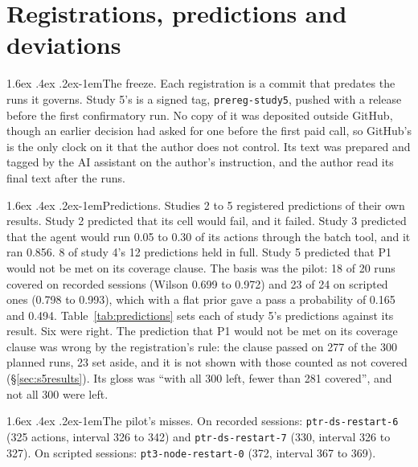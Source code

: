\documentclass[11pt]{article}
\makeatletter
\renewcommand\paragraph{\@startsection{paragraph}{4}{\z@}%
  {1.6ex \@plus .4ex \@minus .2ex}{-1em}{\normalfont\normalsize\bfseries}}
\makeatother
\begin{document}
\appendix

\section{Registrations, predictions and deviations}
\label{app:registration}

\paragraph{The freeze.} Each registration is a commit that predates the runs it governs.
Study 5's is a signed tag, \texttt{prereg-study5}, pushed with a release before the
first confirmatory run. No copy of it was deposited outside GitHub, though an
earlier decision had asked for one before the first paid call, so GitHub's is the only
clock on it that the author does not control. Its text was prepared and tagged by the AI
assistant on the author's instruction, and the author read its final text after the
runs.

\paragraph{Predictions.} Studies 2 to 5 registered predictions of their own results.
Study 2 predicted that its cell would fail, and it failed. Study 3 predicted that the
agent would run 0.05 to 0.30 of its actions through the batch tool, and it ran 0.856.
8 of study 4's 12 predictions held in full. Study 5 predicted that P1 would not be met
on its coverage clause. The basis was the pilot: 18 of 20 runs covered on recorded
sessions (Wilson 0.699 to 0.972) and 23 of 24 on scripted ones (0.798 to 0.993), which
with a flat prior gave a pass a probability of 0.165 and 0.494.
Table~\ref{tab:predictions} sets each of study 5's predictions against its result. Six
were right. The prediction that P1 would not be met on its coverage clause was wrong by
the registration's rule: the clause passed on 277 of the
300 planned runs, 23 set aside, and it is not shown with those counted as not covered
(\S\ref{sec:s5results}). Its gloss was ``with all 300 left, fewer than 281
covered'', and not all 300 were left.

\begin{table}[!htb]
\centering\small

\caption{Study 5: the registered predictions and which were right.}
\label{tab:predictions}
\end{table}

\paragraph{The pilot's misses.} On recorded sessions: \texttt{ptr-ds-restart-6} (325
actions, interval 326 to 342) and \texttt{ptr-ds-restart-7} (330, interval 326 to 327).
On scripted sessions: \texttt{pt3-node-restart-0} (372, interval 367 to 369).
\end{document}
